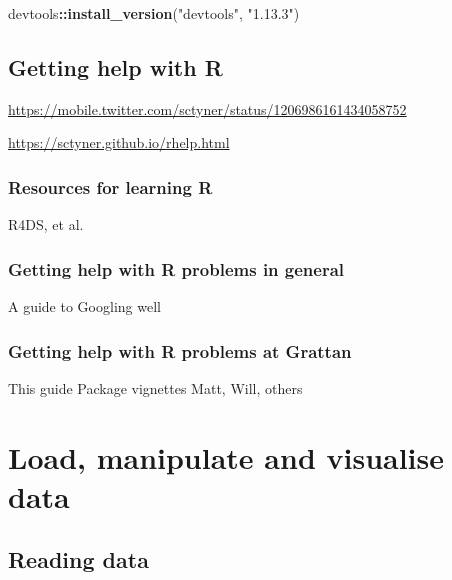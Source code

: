 \documentclass[]{book}
\newenvironment{Shaded}{\begin{snugshade}}{\end{snugshade}}
\newcommand{\KeywordTok}[1]{\textcolor[rgb]{0.13,0.29,0.53}{\textbf{#1}}}
\newcommand{\NormalTok}[1]{#1}
\newcommand{\OperatorTok}[1]{\textcolor[rgb]{0.81,0.36,0.00}{\textbf{#1}}}
\newcommand{\StringTok}[1]{\textcolor[rgb]{0.31,0.60,0.02}{#1}}
\begin{document}
\begin{Shaded}
\begin{Highlighting}[]
\NormalTok{devtools}\OperatorTok{::}\KeywordTok{install_version}\NormalTok{(}\StringTok{"devtools"}\NormalTok{, }\StringTok{"1.13.3"}\NormalTok{)}
\end{Highlighting}
\end{Shaded}

\hypertarget{getting-help-with-r}{%
\chapter{Getting help with R}\label{getting-help-with-r}}

\url{https://mobile.twitter.com/sctyner/status/1206986161434058752}

\url{https://sctyner.github.io/rhelp.html}

\hypertarget{resources-for-learning-r}{%
\section{Resources for learning R}\label{resources-for-learning-r}}

R4DS, et al.

\hypertarget{getting-help-with-r-problems-in-general}{%
\section{Getting help with R problems in general}\label{getting-help-with-r-problems-in-general}}

A guide to Googling well

\hypertarget{getting-help-with-r-problems-at-grattan}{%
\section{Getting help with R problems at Grattan}\label{getting-help-with-r-problems-at-grattan}}

This guide
Package vignettes
Matt, Will, others

\hypertarget{part-load-manipulate-and-visualise-data}{%
\part{Load, manipulate and visualise data}\label{part-load-manipulate-and-visualise-data}}

\hypertarget{reading-data}{%
\chapter{Reading data}\label{reading-data}}
\end{document}

